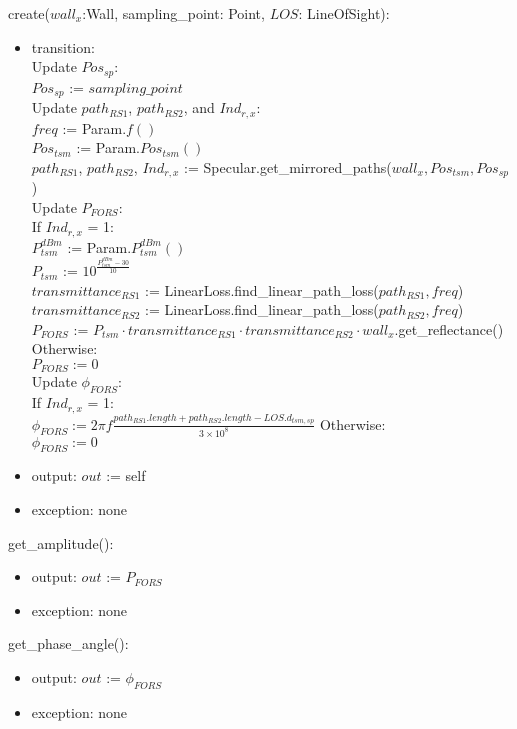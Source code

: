 \documentclass[12pt, titlepage]{article}
\begin{document}
\noindent create($wall_x$:Wall, sampling\_point: Point, $LOS$: LineOfSight):
\begin{itemize}
\item transition:\\
Update $Pos_{sp}$:\\
$Pos_{sp}$ := $sampling\_point$\\

Update $path_{RS1}$, $path_{RS2}$, and $Ind_{r,x}$:\\
$freq$ := Param.$f()$\\
$Pos_{tsm}$ := Param.$Pos_{tsm}()$\\
$path_{RS1}$, $path_{RS2}$, $Ind_{r,x}$ := Specular.get\_mirrored\_paths($wall_{x}, Pos_{tsm}, Pos_{sp}$)\\

Update $P_{FORS}$:\\
If $Ind_{r,x}$ = 1:\\
$P_{tsm}^{dBm}$ := Param.$P_{tsm}^{dBm}()$\\
$P_{tsm}$ := $10^\frac{P_{tsm}^{dBm}-30}{10}$\\
$transmittance_{RS1}$ := LinearLoss.find\_linear\_path\_loss($path_{RS1}, freq$)\\
$transmittance_{RS2}$ := LinearLoss.find\_linear\_path\_loss($path_{RS2}, freq$)\\
$P_{FORS}$ := $P_{tsm} \cdot transmittance_{RS1} \cdot transmittance_{RS2} \cdot wall_x.$get\_reflectance()\\
Otherwise:\\
$P_{FORS} := 0$\\

Update $\phi_{FORS}$:\\
If $Ind_{r,x}$ = 1:\\
$\phi_{FORS} := 2 \pi f \frac{path_{RS1}.length + path_{RS2}.length - LOS.d_{tsm,sp}}{3\times10^8}$
Otherwise:\\
$\phi_{FORS} := 0$

\item output: $out$ := self
\item exception: none
\end{itemize}

\noindent get\_amplitude():
\begin{itemize}
\item output: $out$ := $P_{FORS}$
\item exception: none
\end{itemize}

\noindent get\_phase\_angle():
\begin{itemize}
\item output: $out$ := $\phi_{FORS}$
\item exception: none
\end{itemize}
\end{document}
